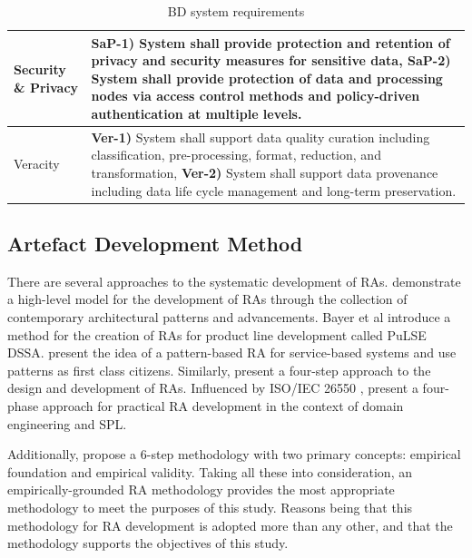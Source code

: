\documentclass[a4paper,11pt]{article}
\let\cite\citep
\begin{document}
\begin{table}[h!t]
\begin{tabular}{|l|p{12cm}|}
        Security \& Privacy & 
        
        \textbf{SaP-1)} System shall provide protection and retention of privacy and security measures for sensitive data, \textbf{SaP-2)} System shall provide protection of data and processing nodes via access control methods and policy-driven authentication at multiple levels. 
        \\

        \hline
        
        Veracity &
        
        \textbf{Ver-1)} System shall support data quality curation including classification, pre-processing, format, reduction, and  transformation, \textbf{Ver-2)} System shall support data provenance including data life cycle management and long-term preservation.
        \\
        \hline
  
    \end{tabular}
        \caption{BD system requirements}\label{table-requirements}
    \end{table}



\subsection{Artefact Development Method} \label{artifactDevelopmentMethodology}
There are several approaches to the systematic development of RAs. \citet{Cloutier} demonstrate a high-level model for the development of RAs through the collection of contemporary architectural patterns and advancements. Bayer et al \cite{bayer1999pulse} introduce a method for the creation of RAs for product line development called PuLSE DSSA. \citet{stricker2010creating} present the idea of a pattern-based RA for service-based systems and use patterns as first class citizens. Similarly, \citet{nakagawa2014consolidating} present a four-step approach to the design and development of RAs. Influenced by ISO/IEC 26550 \cite{wg2015iso}, \citet{Derras} present a four-phase approach for practical RA development in the context of domain engineering and SPL.


Additionally, \citet{galster2011empirically} propose a 6-step methodology with two primary concepts: empirical foundation and empirical validity. Taking all these into consideration, an empirically-grounded RA methodology provides the most appropriate methodology to meet the purposes of this study. Reasons being that this methodology for RA development is adopted more than any other, and that the methodology supports the objectives of this study. 
\end{document}

